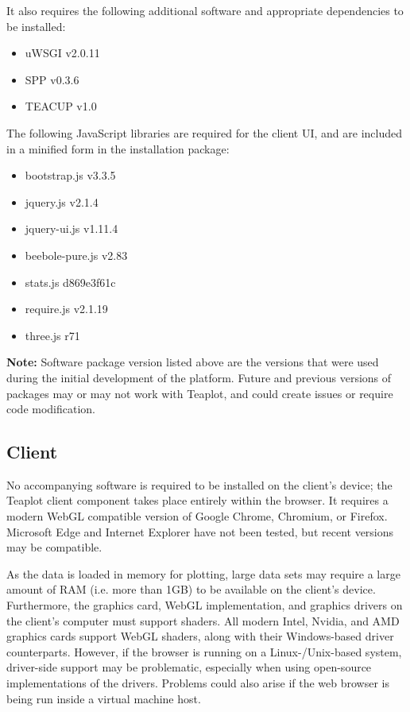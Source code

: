 \documentclass[a4paper,twocolumn,english,11pt, a4paper, conference]{IEEEtran}
\begin{document}
It also requires the following additional software and appropriate dependencies to be installed:

\begin{itemize}
	\item uWSGI v2.0.11 
	\item SPP v0.3.6 \cite{spp}
	\item TEACUP v1.0
\end{itemize}

The following JavaScript libraries are required for the client UI, and are included in a minified form in the installation package:
\begin{itemize}
	\item bootstrap.js v3.3.5 
	\item jquery.js v2.1.4
	\item jquery-ui.js v1.11.4
	\item beebole-pure.js v2.83 \cite{purejs}
	\item stats.js d869e3f61c \cite{statsjs}
	\item require.js v2.1.19 \cite{requirejs}
	\item three.js r71 \cite{threejs}
\end{itemize}

\textbf{Note:} Software package version listed above are the versions that were used during the initial development of the platform. Future and previous versions of packages may or may not work with Teaplot, and could create issues or require code modification.
\subsection{Client}
No accompanying software is required to be installed on the client's device; the Teaplot client component takes place entirely within the browser. It requires a modern WebGL compatible version of Google Chrome, Chromium, or Firefox. Microsoft Edge and Internet Explorer have not been tested, but recent versions may be compatible. 

As the data is loaded in memory for plotting, large data sets may require a large amount of RAM (i.e. more than 1GB) to be available on the client's device. Furthermore, the graphics card, WebGL implementation, and graphics drivers on the client's computer must support shaders. All modern Intel, Nvidia, and AMD graphics cards support WebGL shaders, along with their Windows-based driver counterparts. However, if the browser is running on a Linux-/Unix-based system, driver-side support may be problematic, especially when using open-source implementations of the drivers. Problems could also arise if the web browser is being run inside a virtual machine host. 
\end{document}
